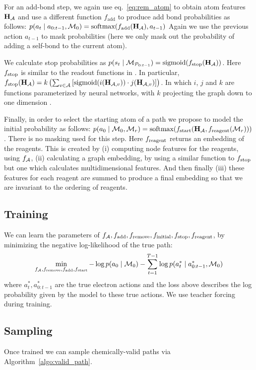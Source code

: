 For an add-bond step, we again use eq.~\eqref{eq:rem_atom} to obtain atom features ${\mathbf{H}}_{{\mathcal{A}}}$ and use a different function $f_{\textrm{add}}$ to produce add bond probabilities as follows: $p(a_t \mid a_{0:t-1}, {\mathcal{M}}_0) = \mbox{softmax}(f_{\textrm{add}}({\mathbf{H}}_{{\mathcal{A}}}), a_{t-1})$
Again we use the previous action $a_{t-1}$ to mask probabilities (here we only mask out the probability of adding a self-bond to the current atom).

We calculate stop probabilities as 
$p(s_t \mid {\mathcal{M}}_{{\mathcal{P}}_{0:t-1}} ) = \mbox{sigmoid}(f_{\textrm{stop}}({\mathbf{H}}_{{\mathcal{A}}}))$.
Here $f_{\textrm{stop}}$ is similar to the readout functions in \citet[eq. 4]{gilmer2017neural}. In particular,
$f_{\textrm{stop}}({\mathbf{H}}_{{\mathcal{A}}}) = k \left( \sum_{v \in {\mathcal{A}}} \left[ \mbox{sigmoid}(i({\mathbf{H}}_{{\mathcal{A}},v})) \cdot j({\mathbf{H}}_{{\mathcal{A}},v}) \right] \right)$.
In which $i$, $j$ and $k$ are functions parameterized by neural networks, with $k$ projecting the graph down to one dimension .


Finally, in order to select the starting atom of a path we propose to model the initial probability as follows: $p(a_0 \mid {\mathcal{M}}_0, {\mathcal{M}}_r) = \mbox{softmax}(f_{\textrm{start}}({\mathbf{H}}_{{\mathcal{A}}}, f_{\textrm{reagent}}({\mathcal{M}}_r)))$. There is no masking used for this step. Here $f_{\textrm{reagent}}$ returns an embedding of the reagents. This is created by (i) computing node features for the reagents, using $f_{{\mathcal{A}}}$, (ii) calculating a graph embedding, by using a similar function to $f_{\textrm{stop}}$ but one which calculates multidimensional features. And then finally (iii) these features for each reagent are summed  to produce a final embedding so that we are invariant to the ordering of reagents.

\subsection{Training}
We can learn the parameters of $f_{{\mathcal{A}}}, f_{\textrm{add}}, f_{\textrm{remove}}, f_{\textrm{initial}},f_{\textrm{stop}}, f_{\textrm{reagent}}$, by minimizing the negative log-likelihood of the true path:
\begin{align}
\min_{f_{{\mathcal{A}}},f_{\textrm{remove}},f_{\textrm{add}},f_{\textrm{start}}} - \log p(a_0 \mid {\mathcal{M}}_0) - \sum_{t=1}^{T-1} \log p(a_t^* \mid a_{0:t-1}^*, {\mathcal{M}}_0) \nonumber
\end{align}
where $a_t^*,a_{0:t-1}^*$ are the true electron actions and the loss above describes the log probability given by the model to these true actions. We use teacher forcing \citet{williams1989learning} during training.

\subsection{Sampling}
Once trained we can sample chemically-valid paths via Algorithm~\ref{algo:valid_path}. 



